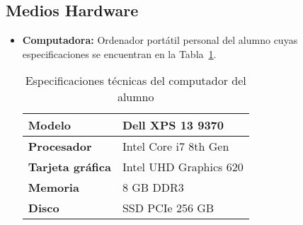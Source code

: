 \subsection{Medios Hardware}
\begin{itemize}
\item \textbf{Computadora:} Ordenador portátil personal del alumno cuyas especificaciones se encuentran en la Tabla~\ref{tab:pc}.
  \begin{table}[H]
        \centering
        \begin{tabular}{|l|l|}
                \hline
                \textbf{Modelo} & Dell XPS 13 9370 \\ \hline
                \textbf{Procesador} & Intel Core i7 8th Gen \\ \hline
                \textbf{Tarjeta gráfica} & Intel UHD Graphics 620 \\ \hline
                \textbf{Memoria} & 8 GB DDR3\\ \hline
                \textbf{Disco} & SSD PCIe 256 GB\\ \hline
        \end{tabular}
        \caption{Especificaciones técnicas del computador del alumno}
        \label{tab:pc}
\end{table}
\end{itemize}

